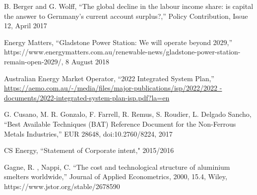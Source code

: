 \documentclass[12pt,a4paper]{article}
\begin{document}
\begin{thebibliography}{1}
B. Berger and G. Wolff, “The global decline in the labour income share: is
capital the answer to Gernmany’s current account surplus?,” Policy Contribution,
Issue 12, April 2017

 Energy Matters, “Gladstone Power Station: We will operate
  beyond 2029,”
  https://www.energymatters.com.au/renewable-news/gladstone-power-station-remain-open-2029/,
  8 August 2018

 Australian Energy Market Operator, “2022 Integrated System
  Plan,”
    \url{https://aemo.com.au/-/media/files/major-publications/isp/2022/2022
    -documents/2022-integrated-system-plan-isp.pdf?la=en}

 G. Cusano, M. R. Gonzalo, F. Farrell, R. Remus, S. Roudier, L.
  Delgado Sancho,   “Best Available Techniques (BAT) Reference Document for the
    Non-Ferrous Metals Industries,” EUR 28648, doi:10.2760/8224, 2017

  CS Energy, ``Statement of Corporate intent," 2015/2016

  Gagne, R. , Nappi, C.  ``The cost and technological structure of aluminium
    smelters worldwide,'' Journal of Applied Econometrics, 2000, 15.4, Wiley,
    https://www.jstor.org/stable/2678590


  

\end{thebibliography}
\end{document}
